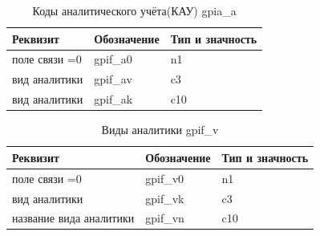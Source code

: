 \begin{table}[h!p]
    \centering
    \scriptsize
    \caption{Коды аналитического учёта(КАУ) gpia\_a}
    \begin{tabular}{|l|l|l|} 

                                                                               \hline
\textbf{Реквизит}       &\textbf{Обозначение}   &\textbf{Тип и значность}   \\ \hline
поле связи          =0  &gpif\_a0               &n1                         \\ \hline
вид аналитики           &gpif\_av               &c3                         \\ \hline
вид аналитики           &gpif\_ak               &c10                        \\ \hline

    \end{tabular}
\end{table}

\begin{table}[h!p]
    \centering
    \scriptsize
    \caption{Виды аналитики gpif\_v}
    \begin{tabular}{|l|l|l|} 

                                                                                   \hline
\textbf{Реквизит}           &\textbf{Обозначение}   &\textbf{Тип и значность}   \\ \hline
поле связи  	  =0        &gpif\_v0               &n1                         \\ \hline
вид аналитики               &gpif\_vk               &c3                         \\ \hline
название вида аналитики     &gpif\_vn               &c10                        \\ \hline

    \end{tabular}
\end{table}

